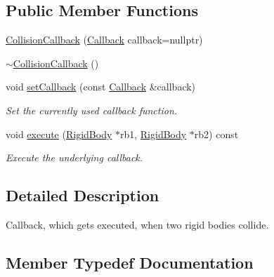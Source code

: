 \subsection*{Public Member Functions}
\begin{DoxyCompactItemize}
\item 
\mbox{\hyperlink{classr3_1_1_collision_callback_ad18bc4d3c1e63ade9cb9ec420de59591}{Collision\+Callback}} (\mbox{\hyperlink{classr3_1_1_collision_callback_afcd5494eafdbd1a0956589b6ec9c0728}{Callback}} callback=nullptr)
\item 
\mbox{\hyperlink{classr3_1_1_collision_callback_af85a61a2c9b93718f6930bb21e27faa0}{$\sim$\+Collision\+Callback}} ()
\item 
void \mbox{\hyperlink{classr3_1_1_collision_callback_ab6a33e6f074ebd6860f396c3b0a78423}{set\+Callback}} (const \mbox{\hyperlink{classr3_1_1_collision_callback_afcd5494eafdbd1a0956589b6ec9c0728}{Callback}} \&callback)
\begin{DoxyCompactList}\small\item\em Set the currently used callback function. \end{DoxyCompactList}\item 
void \mbox{\hyperlink{classr3_1_1_collision_callback_afe734fe9303efadfdd6c1abc3910c432}{execute}} (\mbox{\hyperlink{classr3_1_1_rigid_body}{Rigid\+Body}} $\ast$rb1, \mbox{\hyperlink{classr3_1_1_rigid_body}{Rigid\+Body}} $\ast$rb2) const
\begin{DoxyCompactList}\small\item\em Execute the underlying callback. \end{DoxyCompactList}\end{DoxyCompactItemize}


\subsection{Detailed Description}
Callback, which gets executed, when two rigid bodies collide. 

\subsection{Member Typedef Documentation}
\mbox{\label{classr3_1_1_collision_callback_afcd5494eafdbd1a0956589b6ec9c0728}} 
